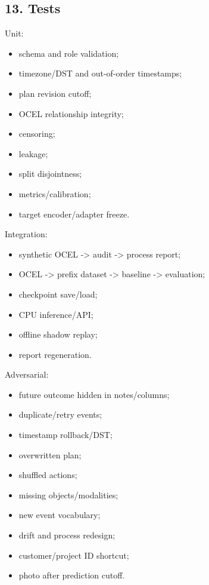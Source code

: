 \documentclass[
  spanish,
  10pt,
  a4paper,
]{article}
\providecommand{\tightlist}{%
  \setlength{\itemsep}{0pt}\setlength{\parskip}{0pt}}
\begin{document}
\subsection{13. Tests}\label{13-tests}

Unit:

\begin{itemize}
\tightlist
\item
  schema and role validation;
\item
  timezone/DST and out-of-order timestamps;
\item
  plan revision cutoff;
\item
  OCEL relationship integrity;
\item
  censoring;
\item
  leakage;
\item
  split disjointness;
\item
  metrics/calibration;
\item
  target encoder/adapter freeze.
\end{itemize}

Integration:

\begin{itemize}
\tightlist
\item
  synthetic OCEL -\textgreater{} audit -\textgreater{} process report;
\item
  OCEL -\textgreater{} prefix dataset -\textgreater{} baseline
  -\textgreater{} evaluation;
\item
  checkpoint save/load;
\item
  CPU inference/API;
\item
  offline shadow replay;
\item
  report regeneration.
\end{itemize}

Adversarial:

\begin{itemize}
\tightlist
\item
  future outcome hidden in notes/columns;
\item
  duplicate/retry events;
\item
  timestamp rollback/DST;
\item
  overwritten plan;
\item
  shuffled actions;
\item
  missing objects/modalities;
\item
  new event vocabulary;
\item
  drift and process redesign;
\item
  customer/project ID shortcut;
\item
  photo after prediction cutoff.
\end{itemize}
\end{document}
